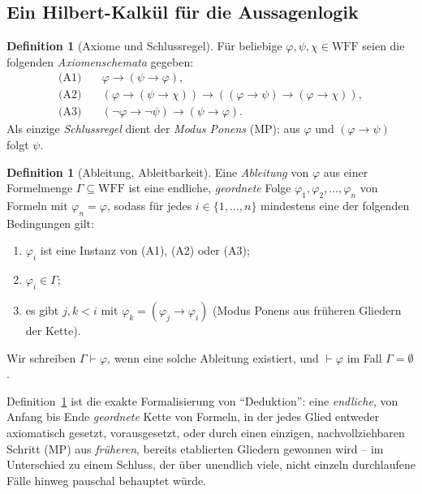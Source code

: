 \documentclass[12pt, a4paper]{article}
\theoremstyle{definition}
\newtheorem{definition}[theorem]{Definition}
\theoremstyle{remark}
\newcommand{\WFF}{\mathrm{WFF}}
\begin{document}
\subsection{Ein Hilbert-Kalkül für die Aussagenlogik}
\label{subsec:hilbertkalkuel}

\begin{definition}[Axiome und Schlussregel]
\label{def:axiome}
Für beliebige $\varphi,\psi,\chi \in \WFF$ seien die folgenden \emph{Axiomenschemata} gegeben:
\begin{align}
\text{(A1)}\quad & \varphi \to (\psi \to \varphi), \\
\text{(A2)}\quad & (\varphi \to (\psi \to \chi)) \to ((\varphi \to \psi) \to (\varphi \to \chi)), \\
\text{(A3)}\quad & (\neg\varphi \to \neg\psi) \to (\psi \to \varphi).
\end{align}
Als einzige \emph{Schlussregel} dient der \emph{Modus Ponens} (MP): aus $\varphi$ und $(\varphi\to\psi)$ folgt $\psi$.
\end{definition}

\begin{definition}[Ableitung, Ableitbarkeit]
\label{def:ableitung}
Eine \emph{Ableitung} von $\varphi$ aus einer Formelmenge $\Gamma \subseteq \WFF$ ist eine endliche, \emph{geordnete} Folge $\varphi_1, \varphi_2, \dots, \varphi_n$ von Formeln mit $\varphi_n = \varphi$, sodass für jedes $i \in \{1,\dots,n\}$ mindestens eine der folgenden Bedingungen gilt:
\begin{enumerate}[label=(\roman*)]
  \item $\varphi_i$ ist eine Instanz von (A1), (A2) oder (A3);
  \item $\varphi_i \in \Gamma$;
  \item es gibt $j,k < i$ mit $\varphi_k = (\varphi_j \to \varphi_i)$ (Modus Ponens aus früheren Gliedern der Kette).
\end{enumerate}
Wir schreiben $\Gamma \vdash \varphi$, wenn eine solche Ableitung existiert, und $\vdash \varphi$ im Fall $\Gamma = \emptyset$.
\end{definition}

Definition~\ref{def:ableitung} ist die exakte Formalisierung von ``Deduktion'': eine \emph{endliche}, von Anfang bis Ende \emph{geordnete} Kette von Formeln, in der jedes Glied entweder axiomatisch gesetzt, vorausgesetzt, oder durch einen einzigen, nachvollziehbaren Schritt (MP) aus \emph{früheren}, bereits etablierten Gliedern gewonnen wird -- im Unterschied zu einem Schluss, der über unendlich viele, nicht einzeln durchlaufene Fälle hinweg pauschal behauptet würde.
\end{document}
